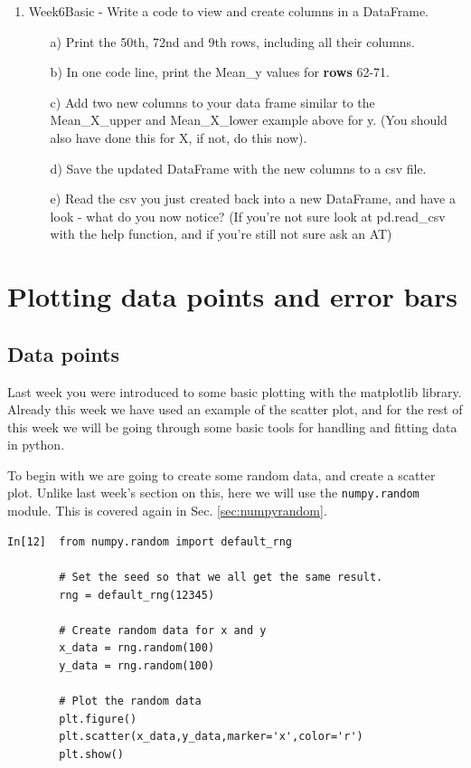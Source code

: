 \begin{enumerate}
    \item Week6Basic - Write a code to view and create columns in a DataFrame.
    \begin{enumerate}
        \item[a)] Print the 50th, 72nd and 9th rows, including all their columns.
        \item[b)] In one code line, print the Mean\_y values for \textbf{rows} 62-71.
        \item[c)] Add two new columns to your data frame similar to the Mean\_X\_upper and Mean\_X\_lower example above for y. (You should also have done this for X, if not, do this now).
        \item[d)] Save the updated DataFrame with the new columns to a csv file.
        \item[e)] Read the csv you just created back into a new DataFrame, and have a look - what do you now notice? (If you're not sure look at pd.read\_csv with the help function, and if you're still not sure ask an AT)
    \end{enumerate}
\end{enumerate}

\newpage

\section{Plotting data points and error bars}
\label{plotdataerror}

\subsection{Data points}
\label{datapoints}

Last week you were introduced to some basic plotting with the matplotlib library. Already this week we have used an example of the scatter plot, and for the rest of this week we will be going through some basic tools for handling and fitting data in python.

To begin with we are going to create some random data, and create a scatter plot. Unlike last week's section on this, here we will use the \texttt{numpy.random} module. This is covered again in Sec. \ref{sec:numpyrandom}.

\begin{lstlisting}[style=PY]
In[12]  from numpy.random import default_rng

        # Set the seed so that we all get the same result.
        rng = default_rng(12345)
        
        # Create random data for x and y
        x_data = rng.random(100)
        y_data = rng.random(100)
        
        # Plot the random data
        plt.figure()
        plt.scatter(x_data,y_data,marker='x',color='r')
        plt.show()
\end{lstlisting}

